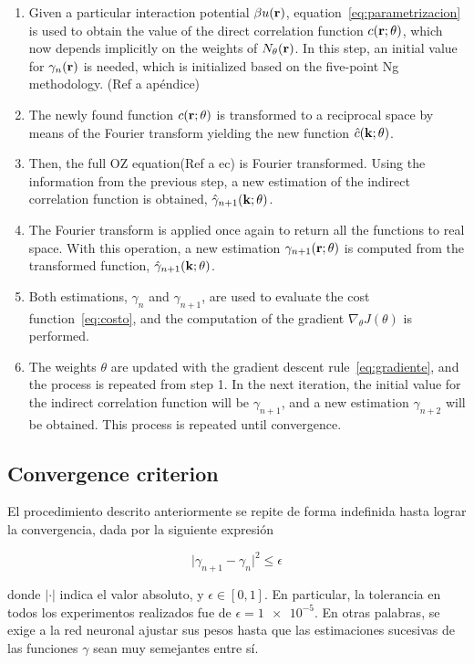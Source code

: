 \begin{enumerate}
    \item Given a particular interaction potential $\beta u(\mathbf{r})$, equation~\eqref{eq:parametrizacion} is used to obtain the value of the direct correlation function $c(\mathbf{r}; \theta)$, which now depends implicitly on the weights of $N_{\theta}(\mathbf{r})$. In this step, an initial value for $\gamma_{n}(\mathbf{r})$ is needed, which is initialized based on the five-point Ng methodology. (Ref a apéndice)
    \item The newly found function $c(\mathbf{r}; \theta)$ is transformed to a reciprocal space by means of the Fourier transform yielding the new function $\hat{c}(\mathbf{k}; \theta)$.
    \item Then, the full OZ equation(Ref a ec) is Fourier transformed. Using the information from the previous step, a new estimation of the indirect correlation function is obtained, $\hat{\gamma}_{n+1}(\mathbf{k}; \theta)$.
    \item The Fourier transform is applied once again to return all the functions to real space. With this operation, a new estimation $\gamma_{n+1}(\mathbf{r}; \theta)$ is computed from the transformed function, $\hat{\gamma}_{n+1}(\mathbf{k}; \theta)$.
    \item Both estimations, $\gamma_{n}$ and $\gamma_{n+1}$, are used to evaluate the cost function~\eqref{eq:costo}, and the computation of the gradient $\nabla_{\theta} J(\theta)$ is performed.
    \item The weights $\theta$ are updated with the gradient descent rule~\eqref{eq:gradiente}, and the process is repeated from step 1. In the next iteration, the initial value for the indirect correlation function will be $\gamma_{n+1}$, and a new estimation $\gamma_{n+2}$ will be obtained. This process is repeated until convergence.
\end{enumerate}

\subsection{Convergence criterion}
El procedimiento descrito anteriormente se repite de forma indefinida hasta lograr la 
convergencia, dada por la siguiente expresión

\begin{equation}
    {\lvert \gamma_{n+1} - \gamma_{n} \rvert}^2 \leq \epsilon
    \label{eq:tolerancia}
\end{equation}

donde $\lvert \cdot \rvert$ indica el valor absoluto, y $\epsilon \in [0, 1]$.
En particular, la tolerancia en todos los experimentos realizados fue de
$\epsilon = \num{1e-5}$.
En otras palabras, se exige a la red neuronal ajustar sus pesos hasta que las estimaciones
sucesivas de las funciones $\gamma$ sean muy semejantes entre sí.

